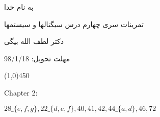 \documentclass[50pt]{article}
\newcommand{\hl}{
\begin{center}
\line(1,0){450}
\end{center}}
\begin{document}
\setLTR 




\begin{RTL}
\Large{








\begin{center}
به نام خدا

تمرینات سری چهارم درس سیگنالها و سیستمها

دکتر لطف الله بیگی

مهلت تحویل: 98/1/18
\end{center}

\hl
\begin{latin}
Chapter 2:

$28\_\{e,f,g\} , 22\_\{d,e,f\} , 40,41,42,44\_\{a,d\},46,72$
\end{latin}






}





\end{RTL}
\end{document}
